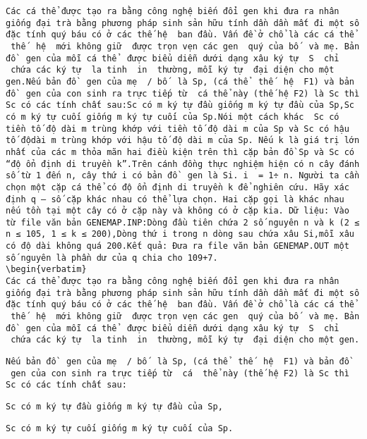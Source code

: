 
\begin{verbatim}
Các cá thể được tạo ra bằng công nghệ biến đổi gen khi đưa ra nhân giống đại trà bằng phương pháp sinh sản hữu tính dần dần mất đi một số đặc tính quý báu có ở các thế hệ  ban đầu. Vấn đề ở chổ là các cá thể  thế  hệ  mới không giữ  được trọn vẹn các gen  quý của bố  và mẹ. Bản đồ  gen của mỗi cá thể  được biểu diễn dưới dạng xâu ký tự  S  chỉ  chứa các ký tự  la tinh  in  thường, mỗi ký tự  đại diện cho một gen.Nếu bản đồ  gen của mẹ  / bố  là Sp, (cá thể  thế  hệ  F1) và bản đồ  gen của con sinh ra trực tiếp từ  cá thể này (thế hệ F2) là Sc thì Sc có các tính chất sau:Sc có m ký tự đầu giống m ký tự đầu của Sp,Sc có m ký tự cuối giống m ký tự cuối của Sp.Nói một cách khác  Sc có tiền tố độ dài m trùng khớp với tiền tố độ dài m của Sp và Sc có hậu tố độdài m trùng khớp với hậu tố độ dài m của Sp. Nếu k là giá trị lớn nhất của các m thỏa mãn hai điều kiện trên thì cặp bản đồ Sp và Sc có “độ ổn định di truyền k”.Trên cánh đồng thực nghiệm hiện có n cây đánh số từ 1 đến n, cây thứ i có bản đồ  gen là Si. i  = 1÷ n. Người ta cần chọn một cặp cá thể có độ ổn định di truyền k để nghiên cứu. Hãy xác định q – số cặp khác nhau có thể lựa chọn. Hai cặp gọi là khác nhau nếu tồn tại một cây có ở cặp này và không có ở cặp kia. Dữ liệu: Vào từ file văn bản GENEMAP.INP:Dòng đầu tiên chứa 2 số nguyên n và k (2 ≤ n ≤ 105, 1 ≤ k ≤ 200),Dòng thứ i trong n dòng sau chứa xâu Si,mỗi xâu có độ dài không quá 200.Kết quả: Đưa ra file văn bản GENEMAP.OUT một số nguyên là phần dư của q chia cho 109+7.
\begin{verbatim}
Các cá thể được tạo ra bằng công nghệ biến đổi gen khi đưa ra nhân giống đại trà bằng phương pháp sinh sản hữu tính dần dần mất đi một số đặc tính quý báu có ở các thế hệ  ban đầu. Vấn đề ở chổ là các cá thể  thế  hệ  mới không giữ  được trọn vẹn các gen  quý của bố  và mẹ. Bản đồ  gen của mỗi cá thể  được biểu diễn dưới dạng xâu ký tự  S  chỉ  chứa các ký tự  la tinh  in  thường, mỗi ký tự  đại diện cho một gen.\end{verbatim}
\begin{verbatim}
Nếu bản đồ  gen của mẹ  / bố  là Sp, (cá thể  thế  hệ  F1) và bản đồ  gen của con sinh ra trực tiếp từ  cá  thể này (thế hệ F2) là Sc thì Sc có các tính chất sau:\end{verbatim}
\begin{verbatim}
Sc có m ký tự đầu giống m ký tự đầu của Sp,\end{verbatim}
\begin{verbatim}
Sc có m ký tự cuối giống m ký tự cuối của Sp.\end{verbatim}
